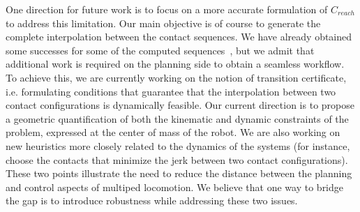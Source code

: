 One direction for future work is to focus on a more accurate formulation of $C_{reach}$ to address 
this limitation.
Our main objective is of course to generate the complete interpolation between the contact sequences.
We have already obtained some successes for some of the computed sequences~\citep{Carpentier2016}, but we admit that additional
work is required on the planning side to obtain a seamless workflow. To achieve this, we are currently working on the notion of transition certificate, i.e. formulating
conditions that guarantee that the interpolation between two contact configurations is dynamically feasible.
Our current direction is to propose a geometric quantification of both the kinematic and dynamic constraints of the problem, expressed
at the center of mass of the robot.
 We are also
working on new heuristics more closely related to the dynamics of the systems (for instance, choose the contacts that minimize the jerk between two contact configurations).
These two points illustrate the need to reduce the distance between the planning and control aspects of multiped locomotion. We believe that one way 
to bridge the gap is to introduce robustness while addressing these two issues.
